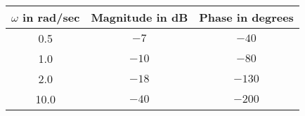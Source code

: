 \begin{tabular}{|c|c|c|}
\hline
$\omega$ in rad/sec & Magnitude in dB & Phase in degrees \\
\hline
0.5 & $-7$  & $-40$  \\
1.0 & $-10$ & $-80$  \\
2.0 & $-18$ & $-130$ \\
10.0 & $-40$ & $-200$ \\
\hline
\end{tabular}
